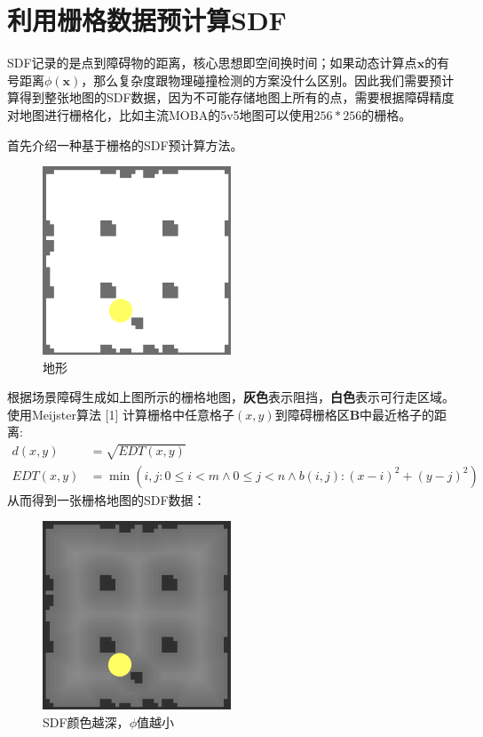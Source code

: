 \hypertarget{ux5229ux7528ux6805ux683cux6570ux636eux9884ux8ba1ux7b97sdf}{%
\section{利用栅格数据预计算SDF}\label{ux5229ux7528ux6805ux683cux6570ux636eux9884ux8ba1ux7b97sdf}}

SDF记录的是点到障碍物的距离，核心思想即空间换时间；如果动态计算点\(\mathbf{x}\)的有号距离\(\phi(\mathbf{x})\)，那么复杂度跟物理碰撞检测的方案没什么区别。因此我们需要预计算得到整张地图的SDF数据，因为不可能存储地图上所有的点，需要根据障碍精度对地图进行栅格化，比如主流MOBA的5v5地图可以使用\(256*256\)的栅格。

首先介绍一种基于栅格的SDF预计算方法。

\begin{figure}
\centering
\includegraphics[width=0.5\textwidth,height=\textheight]{map.png}
\caption{地形}
\end{figure}

根据场景障碍生成如上图所示的栅格地图，\textbf{灰色}表示阻挡，\textbf{白色}表示可行走区域。使用Meijster算法
{[}1{]}
计算栅格中任意格子\((x,y)\)到障碍栅格区\(\mathbf{B}\)中最近格子的距离:
\[
\begin{aligned}
d(x, y)&=\sqrt{EDT(x, y)}\\
EDT(x, y)&=\min(i, j:0\leqslant i < m \wedge 0\leqslant j < n \wedge b(i,j):(x-i)^2+(y-j)^2)
\end{aligned}
\] 从而得到一张栅格地图的SDF数据：

\begin{figure}
\centering
\includegraphics[width=0.5\textwidth,height=\textheight]{sdf_map.png}
\caption{SDF颜色越深，\(\phi\)值越小}
\end{figure}

